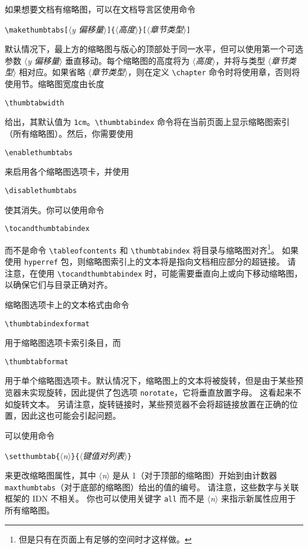 \documentclass[a4paper]{book}%
\newcommand{\sty}[1]{\texttt{#1}}
\newcommand{\meta}[1]{\textnormal{\ensuremath{\langle}\makebox[0pt][l]{}\emph{#1}\makebox[0pt][l]{}\ensuremath{\rangle}}}
\newcommand{\cmd}[1]{\texttt{#1}}
\begin{document}
如果想要文档有缩略图，可以在文档导言区使用命令
\begin{mdframed}
    \verb|\makethumbtabs[|\meta{y 偏移量}\verb|]{|\meta{高度}\verb|}[|\meta{章节类型}\verb|]|
\end{mdframed}
默认情况下，最上方的缩略图与版心的顶部处于同一水平，但可以使用第一个可选参数 \meta{y 偏移量} 垂直移动。每个缩略图的高度将为 \meta{高度}，并将与类型 \meta{章节类型} 相对应。如果省略 \meta{章节类型}，则在定义 \verb|\chapter| 命令时将使用章，否则将使用节。缩略图宽度由长度
\begin{mdframed}
    \verb|\thumbtabwidth|
\end{mdframed}
给出，其默认值为 \cmd{1cm}。\verb|\thumbtabindex| 命令将在当前页面上显示缩略图索引（所有缩略图）。然后，你需要使用
\begin{mdframed}
    \verb|\enablethumbtabs|
\end{mdframed}
来启用各个缩略图选项卡，并使用
\begin{mdframed}
    \verb|\disablethumbtabs|
\end{mdframed}
使其消失。你可以使用命令
\begin{mdframed}
    \verb|\tocandthumbtabindex|
\end{mdframed}
而不是命令 \verb|\tableofcontents| 和 \verb|\thumbtabindex| 将目录与缩略图对齐\footnote{但是只有在页面上有足够的空间时才这样做。}。 如果使用 \sty{hyperref} 包，则缩略图索引上的文本将是指向文档相应部分的超链接。 请注意，在使用 \verb|\tocandthumbtabindex| 时，可能需要垂直向上或向下移动缩略图，以确保它们与目录正确对齐。

缩略图选项卡上的文本格式由命令
\begin{mdframed}
    \verb|\thumbtabindexformat|
\end{mdframed}
用于缩略图选项卡索引条目，而
\begin{mdframed}
    \verb|\thumbtabformat|
\end{mdframed}
用于单个缩略图选项卡。默认情况下，缩略图上的文本将被旋转，但是由于某些预览器未实现旋转，因此提供了包选项 \cmd{norotate}，它将垂直放置字母。 这看起来不如旋转文本。 另请注意，旋转链接时，某些预览器不会将超链接放置在正确的位置，因此这也可能会引起问题。

可以使用命令
\begin{mdframed}
    \verb|\setthumbtab{|\meta{n}\verb|}{|\meta{键值对列表}\verb|}|
\end{mdframed}
来更改缩略图属性，其中 \meta{n} 是从 1（对于顶部的缩略图）开始到由计数器 \cmd{maxthumbtabs}（对于底部的缩略图）给出的值的编号。 请注意，这些数字与关联框架的 IDN 不相关。 你也可以使用关键字 \cmd{all} 而不是 \meta{n} 来指示新属性应用于所有缩略图。
\end{document}
